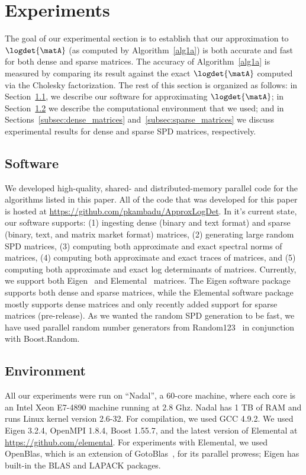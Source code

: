 \section{Experiments}\label{sxn:exps}

The goal of our experimental section is to establish that our approximation
to $\logdet{\matA}$ (as computed by Algorithm~\ref{alg1a}) is both accurate and fast for both
dense and sparse matrices.
The accuracy of Algorithm~\ref{alg1a} is measured by comparing its result
against the exact $\logdet{\matA}$ computed via the Cholesky factorization.
The rest of this section is organized as follows:
in Section~\ref{subsec:software}, we describe our software for approximating
$\logdet{\matA}$; in Section~\ref{subsec:environment} we describe the computational environment that we used; and
in Sections~\ref{subsec:dense_matrices} and~\ref{subsec:sparse_matrices} we
discuss experimental results for dense and sparse SPD matrices, respectively.

\subsection{Software}
\label{subsec:software}
We developed high-quality, shared- and distributed-memory parallel \Cpp{}
code for the algorithms listed in this paper.
All of the code that was developed for this paper is hosted at \url{https://github.com/pkambadu/ApproxLogDet}.
In it's current state, our software supports:
(1) ingesting dense (binary and text format) and sparse (binary,
text, and matrix market format) matrices,
(2) generating large random SPD matrices,
(3) computing both approximate and exact spectral norms of matrices,
(4) computing both approximate and exact traces of matrices, and
(5) computing both approximate and exact log determinants of matrices.
Currently, we support both Eigen~\cite{eigenweb} and
Elemental~\cite{poulson2013elemental} matrices.
The Eigen software package supports both dense and sparse matrices, while the Elemental software package mostly
supports dense matrices and only recently added support for sparse matrices
(pre-release).
As we wanted the random SPD generation to be fast, we have used parallel
random number generators from Random123~\cite{salmon2011parallel} in
conjunction with Boost.Random.


\subsection{Environment}
\label{subsec:environment}
All our experiments were run on ``Nadal'', a 60-core machine, where each
core is an Intel\textregistered{} Xeon\textregistered{} E7-4890 machine running
at 2.8 Ghz.
Nadal has 1 TB of RAM and runs Linux kernel version 2.6-32.
For compilation, we used GCC 4.9.2.
We used Eigen 3.2.4, OpenMPI 1.8.4, Boost 1.55.7, and the latest version of
Elemental at {\small\url{https://github.com/elemental}}.
For experiments with Elemental, we used OpenBlas, which is an extension of
GotoBlas~\cite{goto2008high}, for its parallel prowess; Eigen has built-in the
BLAS and LAPACK packages.


